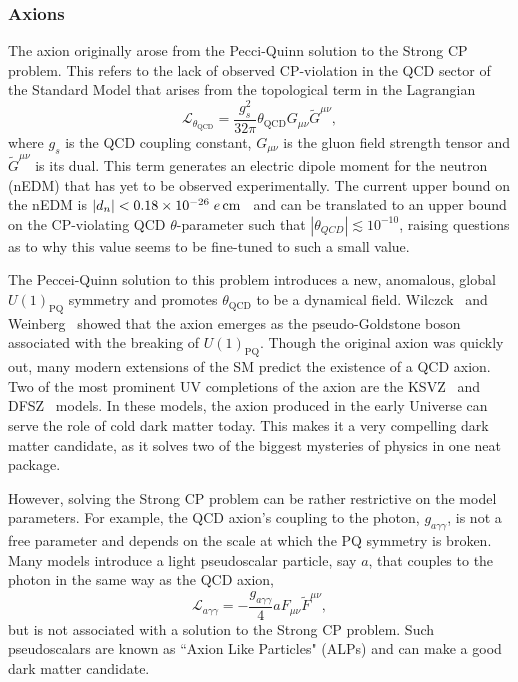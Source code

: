 \subsubsection{Axions}
The axion originally arose from the Pecci-Quinn solution to the Strong CP problem. This refers to the lack of observed CP-violation in the QCD sector of the Standard Model that arises from the topological term in the Lagrangian
\begin{equation}
    \mathcal{L}_{\theta_\mathrm{QCD}} = \frac{g_s^2}{32 \pi}\theta_\mathrm{QCD} G_{\mu\nu} \tilde{G}^{\mu\nu},
\end{equation}
where $g_s$ is the QCD coupling constant, $G_{\mu\nu}$ is the gluon field strength tensor and $\tilde{G}^{\mu\nu}$ is its dual. This term generates an electric dipole moment for the neutron (nEDM) that has yet to be observed experimentally. The current upper bound on the nEDM is $|d_n| < 0.18\times 10^{-26}\;e{\rm \,cm}$~\cite{Abel:2020pzs_feb_MeasurementPermanentElectric} and can be translated to an upper bound on the CP-violating QCD $\theta$-parameter such that $|\theta_{QCD}|\lesssim 10^{-10}$, raising questions as to why this value seems to be fine-tuned to such a small value. 

The Peccei-Quinn solution to this problem introduces a new, anomalous, global  $U(1)_{\mathrm{PQ}}$ symmetry and promotes $\theta_\mathrm{QCD}$ to be a dynamical field.
Wilczck~\cite{Wilczek:1977pj_ProblemStrongInvariance} and Weinberg~\cite{Weinberg:1977ma_NewLightBoson} showed that the axion emerges as the pseudo-Goldstone boson associated with the breaking of $U(1)_\mathrm{PQ}$. Though the original axion was quickly out, many modern extensions of the SM predict the existence of a QCD axion. Two of the most prominent UV completions of the axion are the KSVZ~\cite{Kim:1979if_WeakInteractionSinglet, Shifman:1979if_CanConfinementEnsure} and DFSZ~\cite{_PossibleSuppressionAxion, Dine:1981rt_SimpleSolutionStrong} models. In these models, the axion produced in the early Universe can serve the role of cold dark matter today. This makes it a very compelling dark matter candidate, as it solves two of the biggest mysteries of physics in one neat package. 

However, solving the Strong CP problem can be rather restrictive on the model parameters. For example, the QCD axion's coupling to the photon, $g_{a\gamma\gamma}$, is not a free parameter and depends on the scale at which the PQ symmetry is broken. Many models introduce a light pseudoscalar particle, say $a$, that couples to the photon in the same way as the QCD axion,  
\begin{equation}
    \mathcal{L}_{a\gamma\gamma} = -\frac{g_{a\gamma\gamma}}{4} a F_{\mu\nu}\tilde{F}^{\mu\nu},
\end{equation}
but is not associated with a solution to the Strong CP problem. Such pseudoscalars are known as ``Axion Like Particles" (ALPs) and can make a good dark matter candidate.

